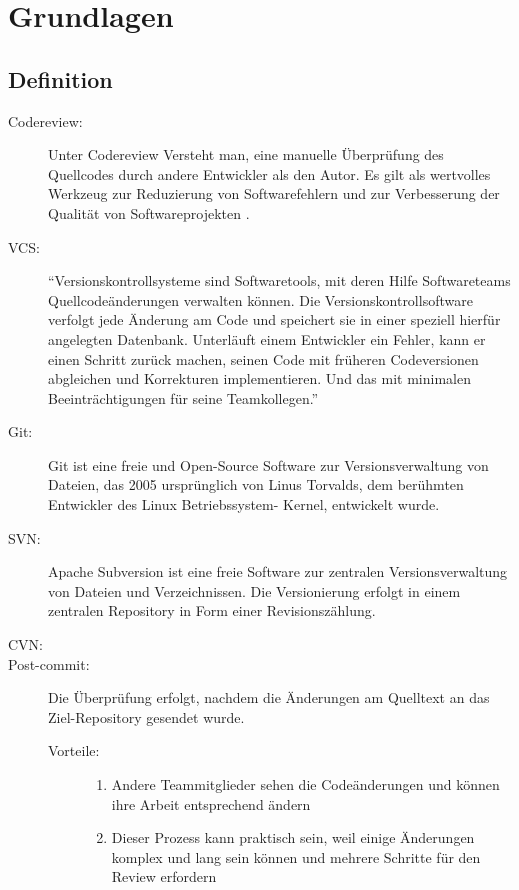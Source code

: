 \section{Grundlagen}
\label{sec:Grundlagen}

\subsection{Definition}
\label{subsec:Definition}

\begin{description}
	\item [Codereview:]
		Unter Codereview Versteht man, eine manuelle Überprüfung des Quellcodes durch andere Entwickler als den Autor. Es gilt als wertvolles Werkzeug zur Reduzierung von 							Softwarefehlern und zur Verbesserung der Qualität von Softwareprojekten \cite{bacchelli2013expectations}.

	\item [VCS:]
		"`Versionskontrollsysteme sind Softwaretools, mit deren Hilfe Softwareteams Quellcodeänderungen verwalten können. Die Versionskontrollsoftware verfolgt jede Änderung am Code und 		speichert sie in einer speziell hierfür angelegten Datenbank. Unterläuft einem Entwickler ein Fehler, kann er einen Schritt zurück machen, seinen Code mit früheren Codeversionen 		abgleichen und Korrekturen implementieren. Und das mit minimalen Beeinträchtigungen für seine Teamkollegen."' \cite{version-control-System}

	\item [Git:]
		Git ist eine freie und Open-Source Software zur Versionsverwaltung von Dateien, das 2005 ursprünglich von Linus Torvalds, dem berühmten Entwickler des Linux Betriebssystem-				Kernel, entwickelt wurde.
	
	\item [SVN:]
		Apache Subversion ist eine freie Software zur zentralen Versionsverwaltung von Dateien und Verzeichnissen. Die Versionierung erfolgt in einem zentralen Repository in Form einer  		Revisionszählung.
	
	\item [CVN:]
	
	\item [Post-commit:]
		Die Überprüfung erfolgt, nachdem die Änderungen am Quelltext an das Ziel-Repository gesendet wurde.
		\begin{description}
			\item [Vorteile:] \hfill
			\begin{enumerate}
				\item Andere Teammitglieder sehen die Codeänderungen und können ihre Arbeit entsprechend ändern
				\item Dieser Prozess kann praktisch sein, weil einige Änderungen komplex und lang sein können und mehrere Schritte für den Review erfordern
			\end{enumerate}
			

\end{description}
\end{description}
